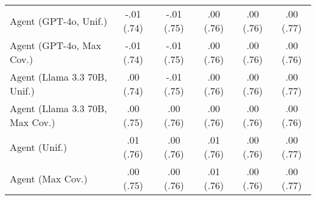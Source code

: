\begin{table}[h!]
\begin{tabular}{lccccc}
    Agent (GPT-4o, Unif.) & -.01 {\small (.74)} & -.01 {\small (.75)} & .00 {\small (.76)} & .00 {\small (.76)} & .00 {\small (.77)} \\
    Agent (GPT-4o, Max Cov.) & -.01 {\small (.74)} & -.01 {\small (.75)} & .00 {\small (.76)} & .00 {\small (.76)} & .00 {\small (.76)} \\
    Agent (Llama 3.3 70B, Unif.) & .00 {\small (.74)} & -.01 {\small (.75)} & .00 {\small (.76)} & .00 {\small (.76)} & .00 {\small (.77)} \\
    Agent (Llama 3.3 70B, Max Cov.) & .00 {\small (.75)} & .00 {\small (.76)} & .00 {\small (.76)} & .00 {\small (.76)} & .00 {\small (.76)} \\
    Agent (Unif.) & .01 {\small (.76)} & \cellcolor{bronze!30}.00 {\small (.76)} & \cellcolor{bronze!30}.01 {\small (.76)} & .00 {\small (.76)} & \cellcolor{bronze!30}.00 {\small (.77)} \\
    Agent (Max Cov.) & .00 {\small (.75)} & .00 {\small (.76)} & .01 {\small (.76)} & .00 {\small (.76)} & \cellcolor{bronze!30}.00 {\small (.77)} \\
    \bottomrule
    \end{tabular}
\end{table}